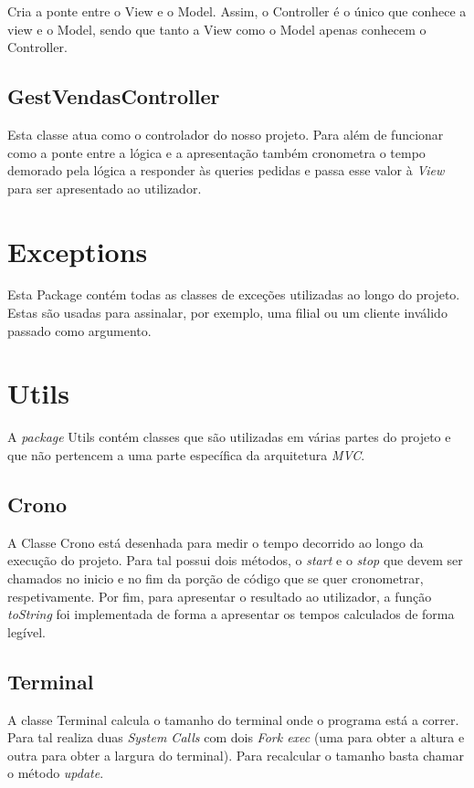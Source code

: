 \documentclass[a4paper]{report}
\begin{document}
Cria a ponte entre o View e o Model. Assim, o Controller é o único que conhece a view e o
Model, sendo que tanto a View como o Model apenas conhecem o Controller.

\subsection{GestVendasController}

Esta classe atua como o controlador do nosso projeto. Para além de funcionar como a ponte entre
a lógica e a apresentação também cronometra o tempo demorado pela lógica a responder às queries pedidas
e passa esse valor à \textit{View} para ser apresentado ao utilizador.

\section{Exceptions}

Esta Package contém todas as classes de exceções utilizadas ao longo do projeto.
Estas são usadas para assinalar, por exemplo, uma filial ou um cliente inválido passado
como argumento.

\section{Utils}

A \textit{package} Utils contém classes que são utilizadas em várias partes do projeto e que não
pertencem a uma parte específica da arquitetura \textit{MVC}.

\subsection{Crono}

A Classe Crono está desenhada para medir o tempo decorrido ao longo da execução do projeto.
Para tal possui dois métodos, o \textit{start} e o \textit{stop} que devem ser chamados no
inicio e no fim da porção de código que se quer cronometrar, respetivamente.
Por fim, para apresentar o resultado ao utilizador, a função \textit{toString} foi implementada
de forma a apresentar os tempos calculados de forma legível.

\subsection{Terminal}

A classe Terminal calcula o tamanho do terminal onde o programa está a correr.
Para tal realiza duas \textit{System Calls} com dois \textit{Fork exec} (uma para obter a altura
e outra para obter a largura do terminal).
Para recalcular o tamanho basta chamar o método \textit{update}.
\end{document}
